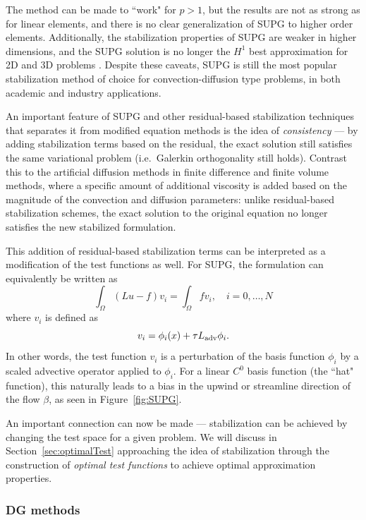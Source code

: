 \documentclass{report}
\newcommand{\secref}[1]{\ref{sec:#1}}
\begin{document}
The method can be made to ``work" for $p>1$, but the results are not as strong as for linear elements, and there is no clear generalization of SUPG to higher order elements.  Additionally, the stabilization properties of SUPG are weaker in higher dimensions, and the SUPG solution is no longer the $H^1$ best approximation for 2D and 3D problems .  Despite these caveats, SUPG is still the most popular stabilization method of choice for convection-diffusion type problems, in both academic and industry applications.  

An important feature of SUPG and other residual-based stabilization techniques that separates it from modified equation methods is the idea of \textit{consistency} --- by adding stabilization terms based on the residual, the exact solution still satisfies the same variational problem (i.e.\ Galerkin orthogonality still holds). Contrast this to the artificial diffusion methods in finite difference and finite volume methods, where a specific amount of additional viscosity is added based on the magnitude of the convection and diffusion parameters: unlike residual-based stabilization schemes, the exact solution to the original equation no longer satisfies the new stabilized formulation.  

This addition of residual-based stabilization terms can be interpreted as a modification of the test functions as well.  For SUPG, the formulation can equivalently be written as
\[
\int_\Omega\left( Lu-f\right) v_i = \int_\Omega f v_i, \quad i = 0,\ldots,N
\]
where $v_i$ is defined as
\[
v_i = \phi_i(x) + \tau L_{\rm adv} \phi_i.  
\]
In other words, the test function $v_i$ is a perturbation of the basis function $\phi_i$ by a scaled advective operator applied to $\phi_i$.  For a linear $C^0$ basis function (the ``hat" function), this naturally leads to a bias in the upwind or streamline direction of the flow $\beta$, as seen in Figure~\ref{fig:SUPG}.  

An important connection can now be made --- stabilization can be achieved by changing the test space for a given problem.  We will discuss in Section~\secref{optimalTest} approaching the idea of stabilization through the construction of \textit{optimal test functions} to achieve optimal approximation properties. 

\subsubsection{DG methods}
\end{document}
